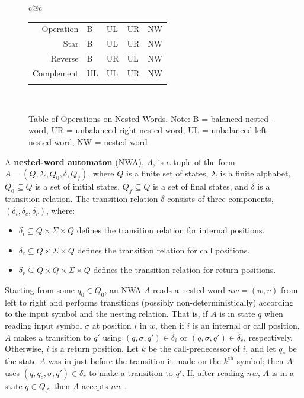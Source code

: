 \begin{figure}[htb]
\begin{tabular}{c@{\hspace{1cm}}c}
\begin{tabular}{|| r || l | l | l | l ||}
    Operation & B & UL & UR & NW \\
\hhline{||=#=|=|=|=||}
    Star & B & UL & UR & NW \\
\hhline{||-||-|-|-|-||}
    Reverse & B & UR & UL & NW \\
\hhline{||-||-|-|-|-||}
    Complement & UL & UL & UR & NW \\
\hhline{|b:=====:b|}
  \end{tabular} \\
\end{tabular}
  \caption{Table of Operations on Nested Words. Note: B = balanced nested-word, UR = unbalanced-right nested-word, UL = unbalanced-left nested-word, NW = nested-word}
  \label{Fig:Ops}
\end{figure}


\begin{definition}
  \label{De:NWA}

  A \textbf{nested-word automaton} (NWA), $A$, is a tuple of the form $A=(Q,
  \Sigma, Q_0, \delta, Q_f)$, where $Q$ is a finite set of states, $\Sigma$
  is a finite alphabet, $Q_0 \subseteq Q$ is a set of initial states, $Q_f
  \subseteq Q$ is a set of final states, and $\delta$ is a transition
  relation. The transition relation $\delta$ consists of three components,
  $(\delta_i, \delta_c, \delta_r)$, where:

  \begin{itemize}
    \item $\delta_i \subseteq Q \times \Sigma \times Q$ defines the
      transition relation for internal positions.
    
    \item $\delta_c \subseteq Q \times \Sigma \times Q$ defines the
      transition relation for call positions.
    
    \item $\delta_r \subseteq Q \times Q \times \Sigma \times Q$ defines the
      transition relation for return positions.
  \end{itemize}
\end{definition}

Starting from some $q_0 \in Q_0$, an NWA $A$ reads a nested word $nw = (w,v)$
from left to right and performs transitions (possibly non-deterministically)
according to the input symbol and the nesting relation. That is, if $A$ is in
state $q$ when reading input symbol $\sigma$ at position $i$ in $w$, then if
$i$ is an internal or call position, $A$ makes a transition to $q'$ using
$(q,\sigma,q') \in \delta_i$ or $(q,\sigma,q') \in \delta_c$,
respectively. Otherwise, $i$ is a return position. Let $k$ be the
call-predecessor of $i$, and let $q_c$ be the state $A$ was in just before
the transition it made on the $k^{\text{th}}$ symbol; then $A$ uses
$(q,q_c,\sigma,q') \in \delta_r$ to make a transition to $q'$.  If, after
reading $nw$, $A$ is in a state $q \in Q_f$, then $A$ accepts $nw$
\cite{DLT:AM2006}.

